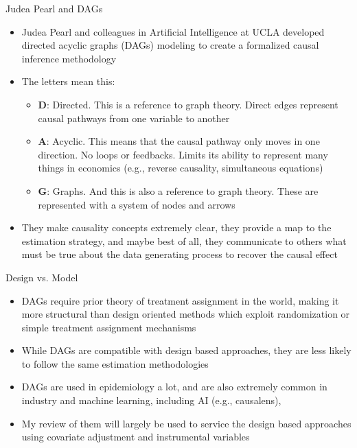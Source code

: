 \documentclass{beamer}
\begin{document}
\begin{frame}{Judea Pearl and DAGs}


  \begin{itemize}
    \item Judea Pearl and colleagues in Artificial Intelligence at UCLA developed directed acyclic graphs (DAGs) modeling to create a formalized causal inference methodology
    \item The letters mean this:
    	\begin{itemize}
	\item \textbf{D}: Directed.  This is a reference to graph theory.  Direct edges represent causal pathways from one variable to another
	\item \textbf{A}: Acyclic.  This means that the causal pathway only moves in one direction.  No loops or feedbacks. Limits its ability to represent many things in economics (e.g., reverse causality, simultaneous equations)
	\item \textbf{G}: Graphs. And this is also a reference to graph theory.  These are represented with a system of nodes and arrows
	\end{itemize}
    \item They make causality concepts extremely clear, they provide a map to the estimation strategy, and maybe best of all, they communicate to others what must be true about the data generating process to recover the causal effect
  \end{itemize}

\end{frame}

\begin{frame}{Design vs. Model}

  \begin{itemize}
    \item DAGs require prior theory of treatment assignment in the world, making it more structural than design oriented methods which exploit randomization or simple treatment assignment mechanisms 
  	\item While DAGs are  compatible with design based approaches, they are less likely to follow the same estimation methodologies
    \item DAGs are used in epidemiology a lot, and are also extremely common in industry and machine learning, including AI (e.g., causalens), 
    \item My review of them will largely be used to service the design based approaches using covariate adjustment and instrumental variables
  \end{itemize}

\end{frame}
\end{document}
